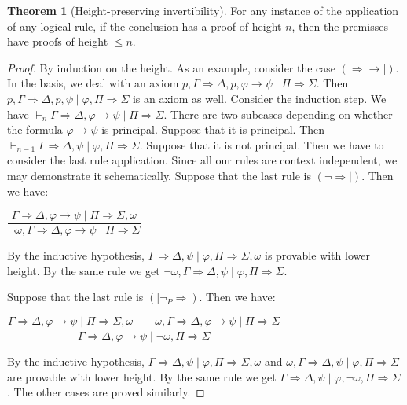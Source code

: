 \documentclass[10pt,a4paper]{article}
\theoremstyle{definition}
\newtheorem{theorem}{\textbf{Theorem}}
\newcommand{\3}{\vspace{.3in}}
\newcommand{\2}{\vspace{.2in}}
\newcommand{\1}{\vspace{.1in}}
\newcommand{\5}{\vspace{.05in}}
\begin{document}
\begin{theorem}[Height-preserving invertibility]\label{Invertability}
For any instance of the application
of any logical rule, if the conclusion has a proof of height $ n $, then the premisses have
proofs of height $\leqslant n $.	
\end{theorem}
\begin{proof}
By induction on the height.	As an example, consider the case $ (\Rightarrow\rightarrow\mid) $. In the basis, we deal with an axiom $ p,\Gamma\Rightarrow\Delta,p,\varphi\rightarrow\psi\mid\Pi\Rightarrow\Sigma $. Then $ p,\Gamma\Rightarrow\Delta,p,\psi\mid\varphi,\Pi\Rightarrow\Sigma $ is an axiom as well. Consider the induction step. We have  $\vdash_n\Gamma\Rightarrow\Delta,\varphi\rightarrow\psi\mid\Pi\Rightarrow\Sigma $. There are two subcases depending on whether the formula $ \varphi\rightarrow\psi $ is principal. Suppose that it is principal. Then $\vdash_{n-1}\Gamma\Rightarrow\Delta,\psi\mid\varphi,\Pi\Rightarrow\Sigma $. Suppose that it is not principal. Then we have to consider the last rule application. Since all our rules are context independent, we may demonstrate it schematically. Suppose that the last rule is $ (\neg \Rightarrow\mid) $. Then we have: 
\begin{center}
	$ \dfrac{\Gamma\Rightarrow\Delta,\varphi\rightarrow\psi\mid\Pi\Rightarrow\Sigma,\omega}{\neg\omega,\Gamma\Rightarrow\Delta,\varphi\rightarrow\psi\mid\Pi\Rightarrow\Sigma} $
\end{center}

By the inductive hypothesis, $ \Gamma\Rightarrow\Delta,\psi\mid\varphi,\Pi\Rightarrow\Sigma,\omega $ is provable with lower height. By the same rule we get $ \neg\omega,\Gamma\Rightarrow\Delta,\psi\mid\varphi,\Pi\Rightarrow\Sigma $.

Suppose that the last rule is $(\mid\neg_P\Rightarrow)$. Then we have: 
\begin{center}
	$ \dfrac{\Gamma\Rightarrow\Delta,\varphi\rightarrow\psi\mid\Pi\Rightarrow\Sigma,\omega\qquad\omega,\Gamma\Rightarrow\Delta,\varphi\rightarrow\psi\mid\Pi\Rightarrow\Sigma}{\Gamma\Rightarrow\Delta,\varphi\rightarrow\psi\mid\neg\omega,\Pi\Rightarrow\Sigma} $
\end{center}

By the inductive hypothesis, $ \Gamma\Rightarrow\Delta,\psi\mid\varphi,\Pi\Rightarrow\Sigma,\omega $ and $ \omega,\Gamma\Rightarrow\Delta,\psi\mid\varphi,\Pi\Rightarrow\Sigma $ are provable with lower height. By the same rule we get $ \Gamma\Rightarrow\Delta,\psi\mid\varphi,\neg\omega,\Pi\Rightarrow\Sigma $. The other cases are proved similarly.
\end{proof}
\end{document}
